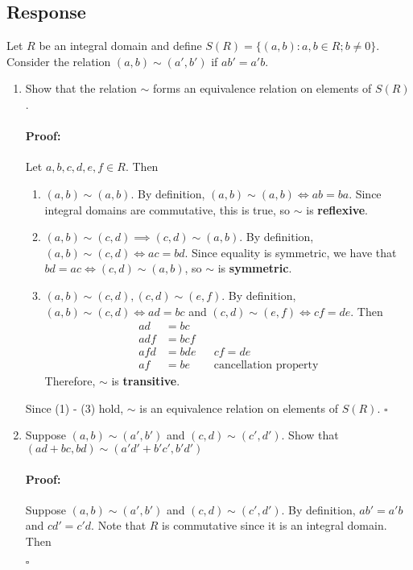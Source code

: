 \documentclass [12pt] {article}
\newenvironment{proof}{\paragraph{Proof:}}{\hfill$\square$}
\begin{document}
\subsection*{Response}
Let $R$ be an integral domain and define $S(R) = \{ (a, b) : a, b \in R; b \neq 0 \}$. Consider
the relation $(a, b) \sim (a', b')$ if $ab' = a'b$.
\begin{enumerate}
    \item Show that the relation $\sim$ forms an equivalence relation on elements of $S(R)$.
        \begin{proof}
            Let $a, b, c, d, e, f \in R$. Then
            \begin{enumerate}[label=\textit{(\roman*)}]
                \item $(a, b) \sim (a, b)$. By definition, $(a, b) \sim (a, b) \iff ab = ba$. Since
                    integral domains are commutative, this is true, so $\sim$ is \textbf{reflexive}.
                \item $(a, b) \sim (c, d) \implies (c, d) \sim (a, b)$. By definition,
                    $(a, b) \sim (c, d) \iff ac = bd$. Since equality is symmetric, we have that
                    $bd = ac \iff (c, d) \sim (a, b)$, so $\sim$ is \textbf{symmetric}.
                \item $(a, b) \sim (c, d), (c, d) \sim (e, f)$. By definition,
                    $(a, b) \sim (c, d) \iff ad = bc$ and $(c, d) \sim (e, f) \iff cf = de$. Then
                    \begin{align*}
                        ad &= bc \\
                        adf &= bcf \\
                        afd &= bde && cf = de \\
                        af &= be && \text{cancellation property}
                    \end{align*}
                    Therefore, $\sim$ is \textbf{transitive}.
            \end{enumerate}
            Since (1) - (3) hold, $\sim$ is an equivalence relation on elements of $S(R)$.
        \end{proof}
    \item Suppose $(a,b)\sim (a',b')$ and $(c,d)\sim (c',d')$. Show that
        $(ad+bc,bd)\sim (a'd'+b'c',b'd')$
        \begin{proof}
            Suppose $(a, b) \sim (a', b')$ and $(c, d) \sim (c', d')$. By definition, $ab' = a'b$
            and $cd' = c'd$. Note that $R$ is commutative since it is an integral domain. Then

\end{proof}
\end{enumerate}
\end{document}
